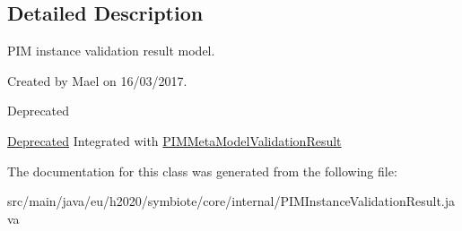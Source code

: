 \subsection{Detailed Description}
P\+IM instance validation result model.

Created by Mael on 16/03/2017.

\begin{DoxyRefDesc}{Deprecated}
\item[\hyperlink{deprecated__deprecated000002}{Deprecated}]Integrated with \hyperlink{classeu_1_1h2020_1_1symbiote_1_1core_1_1internal_1_1PIMMetaModelValidationResult}{P\+I\+M\+Meta\+Model\+Validation\+Result} \end{DoxyRefDesc}


The documentation for this class was generated from the following file\+:\begin{DoxyCompactItemize}
\item 
src/main/java/eu/h2020/symbiote/core/internal/P\+I\+M\+Instance\+Validation\+Result.\+java\end{DoxyCompactItemize}
